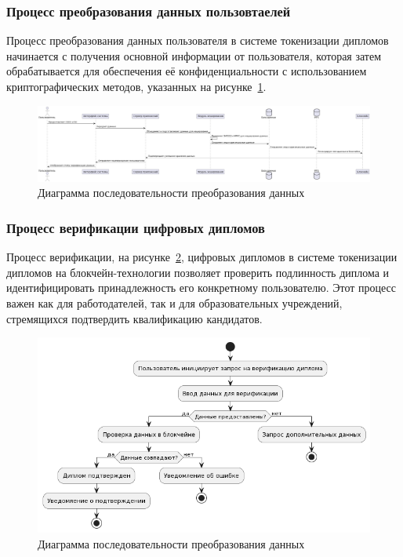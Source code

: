 \subsubsection{Процесс преобразования данных пользовтаелей}

Процесс преобразования данных пользователя в системе токенизации дипломов начинается с получения основной информации от пользователя, которая затем обрабатывается для обеспечения её конфиденциальности с использованием криптографических методов, указанных на рисунке~\ref{fig:data_proc}.

\begin{figure}[H]
	\centering
	\includegraphics[width=.9\textwidth]{images/data_proc.png}
	\parskip=6pt
	\caption{Диаграмма последовательности преобразования данных}
	\label{fig:data_proc}
\end{figure}

\subsubsection{Процесс верификации цифровых дипломов}

Процесс верификации, на рисунке~\ref{fig:diploma_verif}, цифровых дипломов в системе токенизации дипломов на блокчейн-технологии позволяет проверить подлинность диплома и идентифицировать принадлежность его конкретному пользователю. Этот процесс важен как для работодателей, так и для образовательных учреждений, стремящихся подтвердить квалификацию кандидатов.

\begin{figure}[H]
	\centering
	\includegraphics[width=.9\textwidth]{images/diploma_verif.png}
	\parskip=6pt
	\caption{Диаграмма последовательности преобразования данных}
	\label{fig:diploma_verif}
\end{figure}

